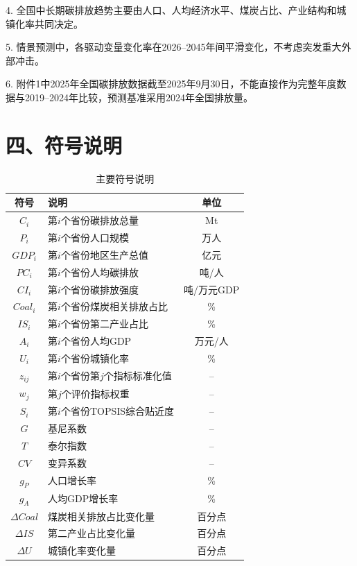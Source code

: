 \documentclass[UTF8,zihao=-4,fontset=windows]{ctexart}
\begin{document}
4. 全国中长期碳排放趋势主要由人口、人均经济水平、煤炭占比、产业结构和城镇化率共同决定。

5. 情景预测中，各驱动变量变化率在2026--2045年间平滑变化，不考虑突发重大外部冲击。

6. 附件1中2025年全国碳排放数据截至2025年9月30日，不能直接作为完整年度数据与2019--2024年比较，预测基准采用2024年全国排放量。

\section*{四、符号说明}

\begin{table}[H]
\centering
\caption{主要符号说明}
\begin{tabularx}{0.92\textwidth}{cXc}
\toprule
符号 & 说明 & 单位 \\
\midrule
$C_i$ & 第$i$个省份碳排放总量 & Mt \\
$P_i$ & 第$i$个省份人口规模 & 万人 \\
$GDP_i$ & 第$i$个省份地区生产总值 & 亿元 \\
$PC_i$ & 第$i$个省份人均碳排放 & 吨/人 \\
$CI_i$ & 第$i$个省份碳排放强度 & 吨/万元GDP \\
$Coal_i$ & 第$i$个省份煤炭相关排放占比 & \% \\
$IS_i$ & 第$i$个省份第二产业占比 & \% \\
$A_i$ & 第$i$个省份人均GDP & 万元/人 \\
$U_i$ & 第$i$个省份城镇化率 & \% \\
$z_{ij}$ & 第$i$个省份第$j$个指标标准化值 & -- \\
$w_j$ & 第$j$个评价指标权重 & -- \\
$S_i$ & 第$i$个省份TOPSIS综合贴近度 & -- \\
$G$ & 基尼系数 & -- \\
$T$ & 泰尔指数 & -- \\
$CV$ & 变异系数 & -- \\
$g_P$ & 人口增长率 & \% \\
$g_A$ & 人均GDP增长率 & \% \\
$\Delta Coal$ & 煤炭相关排放占比变化量 & 百分点 \\
$\Delta IS$ & 第二产业占比变化量 & 百分点 \\
$\Delta U$ & 城镇化率变化量 & 百分点 \\
\bottomrule
\end{tabularx}
\end{table}
\end{document}
